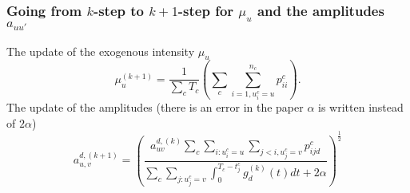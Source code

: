 \documentclass[11pt]{article}%
\begin{document}
\subsubsection{\texorpdfstring{Going from $k$-step to $k+1$-step for $\mu_u$ and the amplitudes $a_{uu'}$}
                              {Change step for amplitude}}
The update of the exogenous intensity $\mu_u$
\begin{equation}
\mu_u^{(k+1)} = \frac{1}{\sum_c T_c} \left( \sum_c \sum_{i=1,u_i^c=u}^{n_c} p_{ii}^c\right).
\end{equation}
The update of the amplitudes (there is an error in the paper $\alpha$ is written instead of $2\alpha$)
\begin{equation}
\label{ak}
a_{u,v}^{d,(k+1)} =
\left(
\frac
{a_{uv}^{d,(k)}\sum_c \sum_{i:u_i^c=u} \sum_{j<i,u_j^c=v} p_{ijd}^c}
{\sum_c \sum_{j:u_j^c=v} \int_0^{T_c-t_j^c} g_d^{(k)}(t)dt + 2\alpha}
\right)^{\frac 1 2}
\end{equation}
\end{document}
